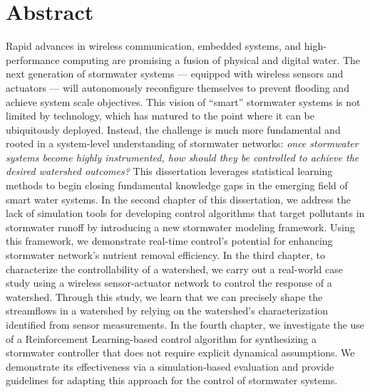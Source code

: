 \begingroup
\let\clearpage\relax
\let\cleardoublepage\relax
\let\cleardoublepage\relax

\chapter*{Abstract}
Rapid advances in wireless communication, embedded systems, and high-performance computing are promising a fusion of physical and digital water.
The next generation of stormwater systems --- equipped with wireless sensors and actuators --- will autonomously reconfigure themselves to prevent  flooding and achieve system scale objectives.
This vision of ``smart'' stormwater systems is not limited by technology, which has matured to the point where it can be ubiquitously deployed.
Instead, the challenge is much more fundamental and rooted in a system-level understanding of stormwater networks: \textit{once stormwater systems become highly instrumented, how should they be controlled to achieve the desired watershed outcomes?} This dissertation leverages statistical learning methods to begin closing fundamental knowledge gaps in the emerging field of smart water systems.
In the second chapter of this dissertation, we address the lack of simulation tools for developing control algorithms that target pollutants in stormwater runoff by introducing a new stormwater modeling framework.
Using this framework, we demonstrate real-time control’s potential for enhancing stormwater network’s nutrient removal efficiency. 
In the third chapter, to characterize the controllability of a watershed, we carry out a real-world case study using a wireless sensor-actuator network to control the response of a watershed. %
Through this study, we learn that we can precisely shape the streamflows in a watershed by relying on the watershed's characterization identified from sensor measurements.
In the fourth chapter, we investigate the use of a Reinforcement Learning-based control algorithm for synthesizing a stormwater controller that does not require explicit dynamical assumptions.
We demonstrate its effectiveness via a simulation-based evaluation and provide guidelines for adapting this approach for the control of stormwater systems.
